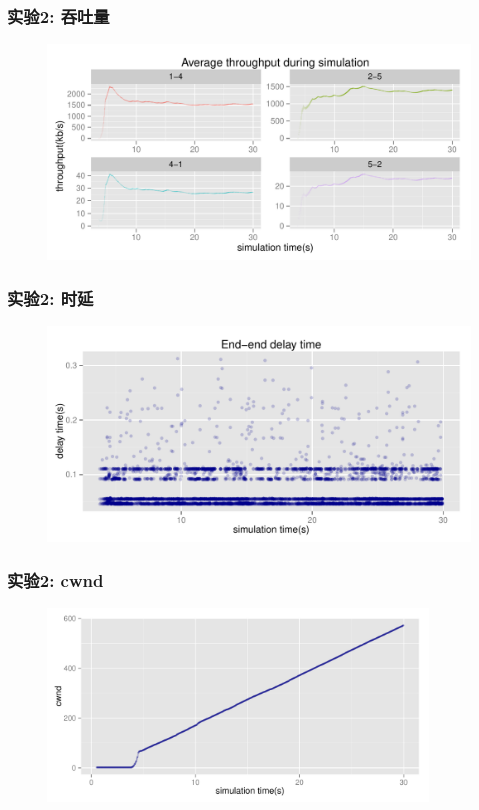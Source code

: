 \documentclass[xcolor={usenames,dvipsnames}]{beamer}
\begin{document}

\begin{frame}
	\frametitle{\textbf{实验}2: \textbf{吞吐量}}
	\begin{figure}
		\includegraphics[width=1.02\textwidth]{pic/plot_cmt1_th_1.pdf}
	\end{figure}
\end{frame}

\begin{frame}
	\frametitle{\textbf{实验}2: \textbf{时延}}
	\begin{figure}
		\includegraphics[width=\textwidth]{pic/plot_cmt1_delay_1.pdf}
	\end{figure}
\end{frame}

\begin{frame}
	\frametitle{\textbf{实验}2: cwnd}
	\begin{figure}
		\includegraphics[width=0.9\textwidth]{pic/plot_cmt1_cwnd_1.pdf}
	\end{figure}
\end{frame}
\end{document}
